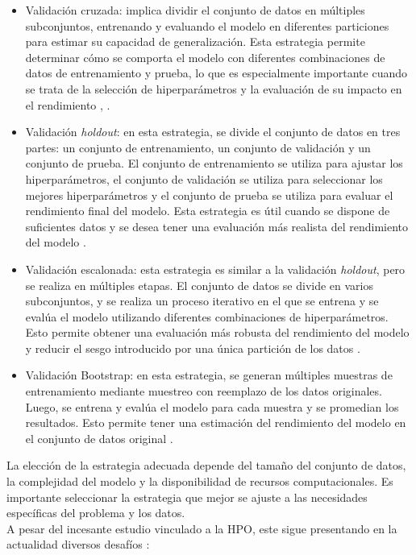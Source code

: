 \begin{itemize}
	\item Validación cruzada: implica dividir el conjunto de datos en múltiples subconjuntos, entrenando y evaluando el modelo en diferentes particiones para estimar su capacidad de generalización. Esta estrategia permite determinar cómo se comporta el modelo con diferentes combinaciones de datos de entrenamiento y prueba, lo que es especialmente importante cuando se trata de la selección de hiperparámetros y la evaluación de su impacto en el rendimiento \citep{hastie2009elements}, \citep{bishop2006pattern}.
	\item Validación \textit{holdout}: en esta estrategia, se divide el conjunto de datos en tres partes: un conjunto de entrenamiento, un conjunto de validación y un conjunto de prueba. El conjunto de entrenamiento se utiliza para ajustar los hiperparámetros, el conjunto de validación se utiliza para seleccionar los mejores hiperparámetros y el conjunto de prueba se utiliza para evaluar el rendimiento final del modelo. Esta estrategia es útil cuando se dispone de suficientes datos y se desea tener una evaluación más realista del rendimiento del modelo \citep{bishop2006pattern}.
	\item Validación escalonada: esta estrategia es similar a la validación \textit{holdout}, pero se realiza en múltiples etapas. El conjunto de datos se divide en varios subconjuntos, y se realiza un proceso iterativo en el que se entrena y se evalúa el modelo utilizando diferentes combinaciones de hiperparámetros. Esto permite obtener una evaluación más robusta del rendimiento del modelo y reducir el sesgo introducido por una única partición de los datos \citep{hastie2009elements}.
	\item Validación Bootstrap: en esta estrategia, se generan múltiples muestras de entrenamiento mediante muestreo con reemplazo de los datos originales. Luego, se entrena y evalúa el modelo para cada muestra y se promedian los resultados. Esto permite tener una estimación del rendimiento del modelo en el conjunto de datos original \citep{davison1997bootstrap}.
\end{itemize}
La elección de la estrategia adecuada depende del tamaño del conjunto de datos, la complejidad del modelo y la disponibilidad de recursos computacionales. Es importante seleccionar la estrategia que mejor se ajuste a las necesidades específicas del problema y los datos. \\
A pesar del incesante estudio vinculado a la HPO, este sigue presentando en la actualidad diversos desafíos \citep{hutter2019automated}:
